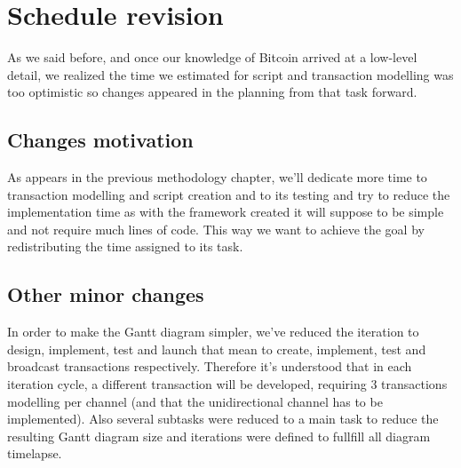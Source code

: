 \chapter*{Schedule revision}
\label{chap:schedule-revision}
As we said before, and once our knowledge of Bitcoin arrived at a low-level detail, we realized the time we estimated for script and transaction modelling was too optimistic so changes appeared in the planning from that task forward.
\section{Changes motivation}
As appears in the previous methodology chapter, we'll dedicate more time to transaction modelling and script creation and to its testing and try to reduce the implementation time as with the framework created it will suppose to be simple and not require much lines of code. This way we want to achieve the goal by redistributing the time assigned to its task.
\section{Other minor changes}
In order to make the Gantt diagram simpler, we've reduced the iteration to design, implement, test and launch that mean to create, implement, test and broadcast transactions respectively. Therefore it's understood that in each iteration cycle, a different transaction will be developed, requiring 3 transactions modelling per channel (and that the unidirectional channel has to be implemented). Also several subtasks were reduced to a main task to reduce the resulting Gantt diagram size and iterations were defined to fullfill all diagram timelapse.
\clearpage
